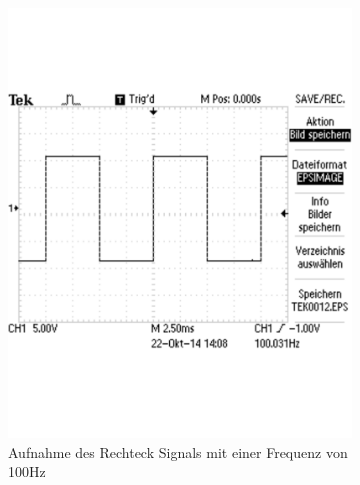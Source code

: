 \documentclass[12pt,a4paper]{article}
\begin{document}
\begin{figure}[H]
        \centering
        \begin{subfigure}[b]{0.28\textwidth}
                \includegraphics[width=\textwidth , scale = 0.4]{2_2_rech_100hz.pdf}
                \caption[Aufnahme des Rechtecksignals mit einer Frequenz von 100Hz]{Aufnahme des Rechteck Signals mit einer Frequenz von 100Hz}
                \label{fig:2_2_rech_100hz}
        \end{subfigure}%
        \hfill
        \begin{subfigure}[b]{0.28\textwidth}

\end{subfigure}
\end{figure}
\end{document}

